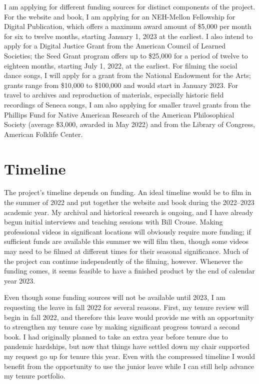 \documentclass[12pt]{article}
\begin{document}
I am applying for different funding sources for distinct components of the
project. 
For the website and book, I am applying for an NEH-Mellon Fellowship for
Digital Publication, which offers a maximum award amount of \$5,000 per month
for six to twelve months, starting January 1, 2023 at the earliest.
I also intend to apply for a Digital Justice Grant from the American Council
of Learned Societies; the Seed Grant program offers up to \$25,000 for a
period of twelve to eighteen months, starting July 1, 2022, at the earliest.
For filming the social dance songs, I will apply for a grant from the National
Endowment for the Arts; grants range from \$10,000 to \$100,000 and would
start in January 2023. 
For travel to archives and reproduction of materials, especially historic
field recordings of Seneca songs, I am also applying for smaller travel grants
from the Phillips Fund for Native American Research of the American
Philosophical Society (average \$3,000, awarded in May 2022) and from the
Library of Congress, American Folklife Center.

\section{Timeline}

The project's timeline depends on funding.
An ideal timeline would be to film in the summer of 2022 and put together the
website and book during the 2022--2023 academic year.
My archival and historical research is ongoing, and I have already begun
initial interviews and teaching sessions with Bill Crouse.
Making professional videos in significant locations will obviously require
more funding; if sufficient funds are available this summer we will film then,
though some videos may need to be filmed at different times for their seasonal
significance.
Much of the project can continue independently of the filming, however.
Whenever the funding comes, it seems feasible to have a finished product by
the end of calendar year 2023.

Even though some funding sources will not be available until 2023, I am
requesting the leave in fall 2022 for several reasons.
First, my tenure review will begin in fall 2022, and therefore this leave
would provide me with an opportunity to strengthen my tenure case by making
significant progress toward a second book.
I had originally planned to take an extra year before tenure due to pandemic
hardships, but now that things have settled down my chair supported my
request go up for tenure this year.
Even with the compressed timeline I would benefit from the opportunity to use
the junior leave while I can still help advance my tenure portfolio.
\end{document}
